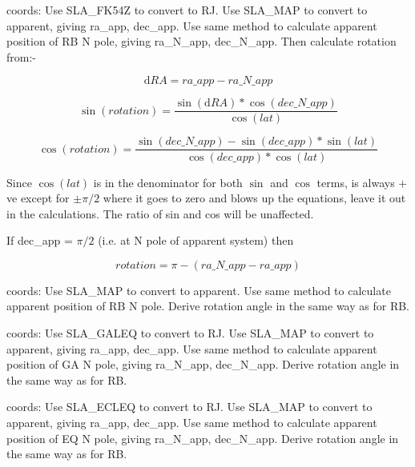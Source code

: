 {{{         \sstitem
         [RB] coords:
            Use SLA\_FK54Z to convert to RJ.
            Use SLA\_MAP to convert to apparent, giving ra\_app, dec\_app.
            Use same method to calculate apparent position of RB N pole, giving
            ra\_N\_app, dec\_N\_app.
            Then calculate rotation from:-

\begin{equation}
\mathrm{d}RA =  ra\_app - ra\_N\_app
\end{equation}

\begin{equation}
\sin (rotation) =   \frac{\sin(\mathrm{d}RA) * \cos(dec\_N\_app)}{\cos(lat)}
\end{equation}

\begin{equation}
\cos (rotation) = \frac{\sin(dec\_N\_app) - \sin(dec\_app) * \sin(lat)}{\cos(dec\_app) * \cos(lat)}
\end{equation}

     Since $\cos(lat)$ is in the denominator for both $\sin$ and $\cos$ terms,
         is always $+$ve except for $\pm \pi/2$ where it goes to zero and blows
         up the equations, leave it out in the calculations. The ratio
         of sin and cos will be unaffected.

         If dec\_app = $\pi/2$ (i.e. at N pole of apparent system) then

\begin{equation}
rotation = \pi - (ra\_N\_app - ra\_app)
\end{equation}

         \sstitem
         [RJ] coords:
            Use SLA\_MAP to convert to apparent.
            Use same method to calculate apparent position of RB N pole.
            Derive rotation angle in the same way as for RB.

         \sstitem
         [GA] coords:
            Use SLA\_GALEQ to convert to RJ.
            Use SLA\_MAP to convert to apparent, giving ra\_app, dec\_app.
            Use same method to calculate apparent position of GA N pole, giving
            ra\_N\_app, dec\_N\_app.
            Derive rotation angle in the same way as for RB.

         \sstitem
         [EQ] coords:
            Use SLA\_ECLEQ to convert to RJ.
            Use SLA\_MAP to convert to apparent, giving ra\_app, dec\_app.
            Use same method to calculate apparent position of EQ N pole, giving
            ra\_N\_app, dec\_N\_app.
            Derive rotation angle in the same way as for RB.

}}}
